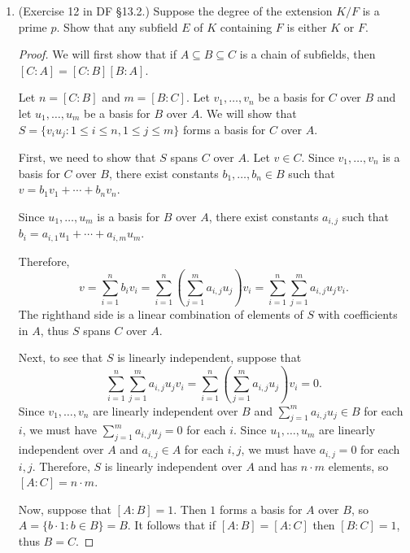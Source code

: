 \documentclass[10pt]{article}
\newcommand{\Q}{\mathbf{Q}}
\begin{document}
\begin{enumerate}
\begin{proof}

\end{proof}




\item (Exercise 12 in DF \S 13.2.) Suppose the degree of the extension $K/F$ is a prime $p$.  Show that any subfield $E$ of $K$ containing $F$ is either $K$ or $F$.


\begin{proof}

We will first show that if $A \subseteq B \subseteq C$ is a chain of subfields, then $[C:A] = [C:B][B:A]$.

Let $n = [C:B]$ and $m = [B:C]$.  Let $v_1, \dots, v_n$ be a basis for $C$ over $B$ and let $u_1, \dots , u_m$ be a basis for $B$ over $A$.  We will show that $S = \{v_iu_j : 1 \leq i \leq n, 1 \leq j \leq m\}$ forms a basis for $C$ over $A$.

First, we need to show that $S$ spans $C$ over $A$.  Let $v \in C$.  Since $v_1, \dots, v_n$ is a basis for $C$ over $B$, there exist constants $b_1, \dots, b_n \in B$ such that $v = b_1v_1 + \cdots + b_nv_n$.

Since $u_1, \dots, u_m$ is a basis for $B$ over $A$, there exist constants $a_{i,j}$ such that $b_i = a_{i,1}u_1 + \cdots + a_{i,m}u_m$.

Therefore, $$v = \sum_{i=1}^n b_iv_i = \sum_{i=1}^n \left(\sum_{j=1}^m a_{i,j}u_j \right)v_i = \sum_{i=1}^n\sum_{j=1}^m a_{i,j}u_j v_i.$$ The righthand side is a linear combination of elements of $S$ with coefficients in $A$, thus $S$ spans $C$ over $A$.

Next, to see that $S$ is linearly independent, suppose that $$\sum_{i=1}^n\sum_{j=1}^m a_{i,j}u_j v_i = \sum_{i=1}^n \left(\sum_{j=1}^m a_{i,j}u_j \right)v_i = 0.$$  Since $v_1, \dots, v_n$ are linearly independent over $B$ and $\sum_{j=1}^m a_{i,j}u_j \in B$ for each $i$, we must have $\sum_{j=1}^m a_{i,j}u_j = 0$ for each $i$.  Since $u_1, \dots, u_m$ are linearly independent over $A$ and $a_{i,j} \in A$ for each $i,j$, we must have $a_{i,j} = 0$ for each $i,j$.  Therefore, $S$ is linearly independent over $A$ and has $n \cdot m$ elements, so $[A:C] = n \cdot m$.

Now, suppose that $[A:B] = 1$.  Then $1$ forms a basis for $A$ over $B$, so $A = \{b \cdot 1 : b \in B\} = B$.  It follows that if $[A:B] = [A:C]$ then $[B:C] = 1$, thus $B = C$.


\end{proof}
\end{enumerate}
\end{document}
